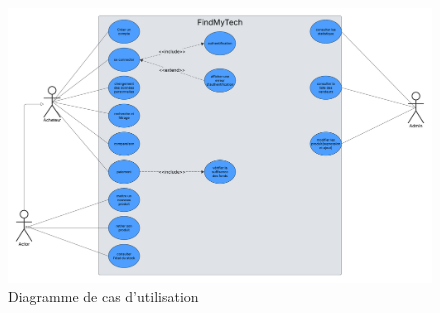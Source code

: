 \documentclass[a4paper,12pt]{article}
\begin{document}
\begin{figure}
    \includegraphics[width=\textwidth]{out/diagrammes/diagramme_des_cas d'utilisation.pdf}
    \caption{Diagramme de cas d'utilisation}
\end{figure}

\clearpage
\end{document}
